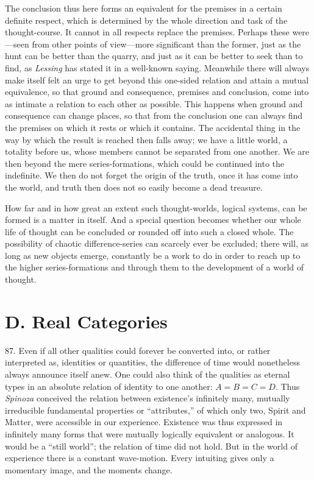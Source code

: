 \documentclass[12pt,a4paper]{book}
\newcommand{\opage}[1]{\marginnote{\footnotesize\textit{[#1]}}}
\begin{document}
The conclusion thus here forms an equivalent for the premises in a certain
definite respect, which is determined by the whole direction and task of the
thought-course. It cannot in all respects replace the premises. Perhaps these
were---seen from other points of view---more significant than the former,
just as the hunt can be better than the quarry, and just as it can be better
to seek than to find, as \emph{Lessing} has stated it in a well-known saying.
Meanwhile there will always make itself felt an urge to get beyond this
one-sided relation and attain a mutual equivalence, so that ground and
consequence, premises and conclusion, come into as intimate a relation to
each other as possible. This happens when ground and consequence can change
places, so that from the conclusion one can always find the premises on which
it rests or which it contains. The accidental thing in the way by which the
result is reached then falls away; we have a little world, a totality before
us, whose members cannot be separated from one another. We are then beyond
the mere series-formations, which could be continued into the indefinite. We
\opage{207}then do not forget the origin of the truth, once it has come into the world,
and truth then does not so easily become a dead treasure.

How far and in how great an extent such thought-worlds, logical systems, can
be formed is a matter in itself. And a special question becomes whether our
whole life of thought can be concluded or rounded off into such a closed
whole. The possibility of chaotic difference-series can scarcely ever be
excluded; there will, as long as new objects emerge, constantly be a work to
do in order to reach up to the higher series-formations and through them to
the development of a world of thought.

\section*{D. Real Categories}
\label{sec:reale-kategorier}

87. Even if all other qualities could forever be converted into, or rather
interpreted as, identities or quantities, the difference of time would
nonetheless always announce itself anew. One could also think of the
qualities as eternal types in an absolute relation of identity to one
another: $A=B=C=D$. Thus \emph{Spinoza} conceived the relation between
existence's infinitely many, mutually irreducible fundamental properties or
``attributes,'' of which only two, Spirit and Matter, were accessible in our
experience. Existence was thus expressed in infinitely many forms that were
mutually logically equivalent or analogous. It would be a ``still world'';
the relation of time did not hold. But in the world of experience there is a
constant wave-motion. Every intuiting gives only a momentary image, and the
moments change.
\end{document}

